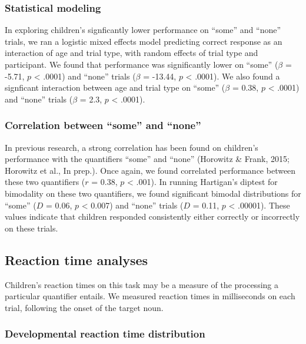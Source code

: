 \documentclass[10pt, letterpaper]{article}
\begin{document}
\subsubsection{Statistical modeling}\label{statistical-modeling}

In exploring children's signficantly lower performance on ``some'' and
``none'' trials, we ran a logistic mixed effects model predicting
correct response as an interaction of age and trial type, with random
effects of trial type and participant. We found that performance was
significantly lower on ``some'' (\(\beta\) = -5.71, \(p\) \textless{}
.0001) and ``none'' trials (\(\beta\) = -13.44, \(p\) \textless{}
.0001). We also found a signficant interaction between age and trial
type on ``some'' (\(\beta\) = 0.38, \(p\) \textless{} .0001) and
``none'' trials (\(\beta\) = 2.3, \(p\) \textless{} .0001).

\subsubsection{Correlation between ``some'' and
``none''}\label{correlation-between-some-and-none}

In previous research, a strong correlation has been found on children's
performance with the quantifiers ``some'' and ``none'' (Horowitz \&
Frank, 2015; Horowitz et al., In prep.). Once again, we found correlated
performance between these two quantifiers (\(r\) = 0.38, \(p\)
\textless{} .001). In running Hartigan's diptest for bimodality on these
two quantifiers, we found significant bimodal distributions for ``some''
(\(D\) = 0.06, \(p\) \textless{} 0.007) and ``none'' trials (\(D\) =
0.11, \(p\) \textless{} .00001). These values indicate that children
responded consistently either correctly or incorrectly on these trials.

\subsection{Reaction time analyses}\label{reaction-time-analyses}

Children's reaction times on this task may be a measure of the
processing a particular quantifier entails. We measured reaction times
in milliseconds on each trial, following the onset of the target noun.

\subsubsection{Developmental reaction time
distribution\\}\label{developmental-reaction-time-distribution}
\end{document}
